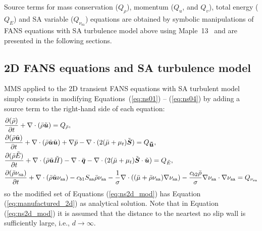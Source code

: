 \documentclass[10pt]{article}
\newcommand{\Diff}[2] {\dfrac{\partial( #1)}{\partial #2}}
\newcommand{\bv}[1]{\ensuremath{\mbox{\boldmath$ #1 $}}}
\newcommand{\sa}{\nu_{\mathrm{sa}}}
\newcommand{\tsa}{\mathrm{sa}}
\newcommand{\brho}{\bar{\rho}}
\newcommand{\tu}{\tilde{u}}
\newcommand{\tE}{\tilde{E}}
\newcommand{\bmu}{\bar{\mu}}
\begin{document}
Source terms  for mass conservation ($Q_\rho$), momentum ($Q_u$, and $Q_v$), total energy ($Q_{E}$) and SA variable ($Q_{\sa}$) equations are obtained by symbolic manipulations of FANS equations with SA turbulence model above using Maple~13~\citep{Maple} and are presented in the following sections.



 \subsection{2D FANS equations and SA turbulence model}\label{NS+SA}



MMS applied to the 2D transient FANS equations with SA turbulent model simply consists in modifying Equations~(\ref{eq:ns01}) -- (\ref{eq:ns04}) by adding a source term to the right-hand side of each equation:
 \begin{equation}
 \begin{split} \label{eq:ns2d_mod}
 &\Diff{\bar{\rho}}{t} +\nabla \cdot \left(\bar{\rho} \tilde{\bv{u}}\right) = Q_{\brho},\\
 &\Diff{\bar{\rho} \tilde{\bv{u}}}{t} +\nabla\cdot\left(\bar{\rho} \tilde{\bv{u}}\tilde{\bv{u}}\right) +\nabla \bar{p} -  \nabla \cdot ( 2(\bmu+\mu_t) \tilde{\bv{S}} )= Q_{\bv{\tu}},\\
 & \Diff{\bar{\rho} \tilde{E}}{t}+ \nabla \cdot (\bar{\rho} \tilde{\bv{u}} \tilde{H})-\nabla \cdot \bar{\bv{q}} - \nabla\cdot(2 (\bmu+\mu_t) \tilde{\bv{S}} \cdot \tilde{\bv{u}})= Q_{\tE},\\
 &\Diff{\bar{\rho} \sa}{t} +\nabla \cdot (\bar{\rho} \tilde{\bv{u}} \sa) - c_{b1} S_\tsa \bar{\rho} \sa - \dfrac{1 }{\sigma}\nabla \cdot \left( (\bmu+\bar{\rho}  \sa) \nabla \sa\right) -\dfrac{c_{b2} \bar{\rho} }{\sigma} \nabla \sa \cdot \nabla \sa =Q_{\sa}
 \end{split}
 \end{equation}
so the modified set of Equations (\ref{eq:ns2d_mod}) has Equation (\ref{eq:manufactured_2d}) as analytical solution. Note that in Equation (\ref{eq:ns2d_mod}) it is assumed that the distance to the neartest no slip wall is sufficiently large, i.e., $d\rightarrow\infty$.
\end{document}
